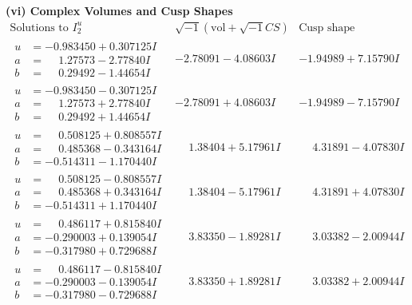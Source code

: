\documentclass[1p]{elsarticle_modified}
\theoremstyle{definition}
\newcommand{\I}{\sqrt{-1}}
\begin{document}
\newpage\flushleft \textbf{(vi) Complex Volumes and Cusp Shapes}
$$\begin{array}{c|c|c}  
\text{Solutions to }I^u_{2}& \I (\text{vol} + \sqrt{-1}CS) & \text{Cusp shape}\\
 \hline 
\begin{aligned}
u &= -0.983450 + 0.307125 I \\
a &= \phantom{-}1.27573 - 2.77840 I \\
b &= \phantom{-}0.29492 - 1.44654 I\end{aligned}
 & -2.78091 - 4.08603 I & -1.94989 + 7.15790 I \\ \hline\begin{aligned}
u &= -0.983450 - 0.307125 I \\
a &= \phantom{-}1.27573 + 2.77840 I \\
b &= \phantom{-}0.29492 + 1.44654 I\end{aligned}
 & -2.78091 + 4.08603 I & -1.94989 - 7.15790 I \\ \hline\begin{aligned}
u &= \phantom{-}0.508125 + 0.808557 I \\
a &= \phantom{-}0.485368 - 0.343164 I \\
b &= -0.514311 - 1.170440 I\end{aligned}
 & \phantom{-}1.38404 + 5.17961 I & \phantom{-}4.31891 - 4.07830 I \\ \hline\begin{aligned}
u &= \phantom{-}0.508125 - 0.808557 I \\
a &= \phantom{-}0.485368 + 0.343164 I \\
b &= -0.514311 + 1.170440 I\end{aligned}
 & \phantom{-}1.38404 - 5.17961 I & \phantom{-}4.31891 + 4.07830 I \\ \hline\begin{aligned}
u &= \phantom{-}0.486117 + 0.815840 I \\
a &= -0.290003 + 0.139054 I \\
b &= -0.317980 + 0.729688 I\end{aligned}
 & \phantom{-}3.83350 - 1.89281 I & \phantom{-}3.03382 - 2.00944 I \\ \hline\begin{aligned}
u &= \phantom{-}0.486117 - 0.815840 I \\
a &= -0.290003 - 0.139054 I \\
b &= -0.317980 - 0.729688 I\end{aligned}
 & \phantom{-}3.83350 + 1.89281 I & \phantom{-}3.03382 + 2.00944 I \\ \hline\begin{aligned}

\end{aligned}
\end{array}$$
\end{document}
